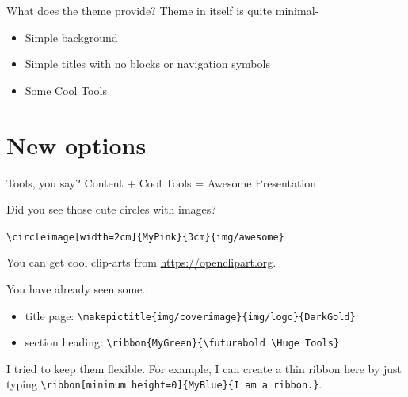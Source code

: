 \documentclass[xetex, aspectratio=169,professionalfont]{beamer}
\begin{document}
\begin{frame}[fragile]{What does the theme provide?}
	Theme in itself is quite minimal-
	\begin{itemize}
		\item Simple background
		\item Simple titles with no blocks or navigation symbols
		\item \alert{Some Cool Tools}
	\end{itemize}
	
\end{frame}

\section{New options}
\begin{frame}
	\vspace{2\baselineskip}
\end{frame}

\begin{frame}[fragile]{Tools, you say?}
\centering
	\alert{Content + Cool Tools = Awesome Presentation}\vspace*{\baselineskip}
	
		Did you see those cute circles with images?

\verb|\circleimage[width=2cm]{MyPink}{3cm}{img/awesome}| \vspace*{\baselineskip}


		
		You can get cool clip-arts from \url{https://openclipart.org}.

	
\end{frame}

\begin{frame}[fragile]{You have already seen some..}
	\centering 
	\begin{itemize}
		\item title page: \verb|\makepictitle{img/coverimage}{img/logo}{DarkGold}|
		\item section heading: \verb|\ribbon{MyGreen}{\futurabold \Huge Tools}|
	\end{itemize}
	I tried to keep them flexible. For example, I can create a thin ribbon here by just typing \verb|\ribbon[minimum height=0]{MyBlue}{I am a ribbon.}|.

\end{frame}
\end{document}
